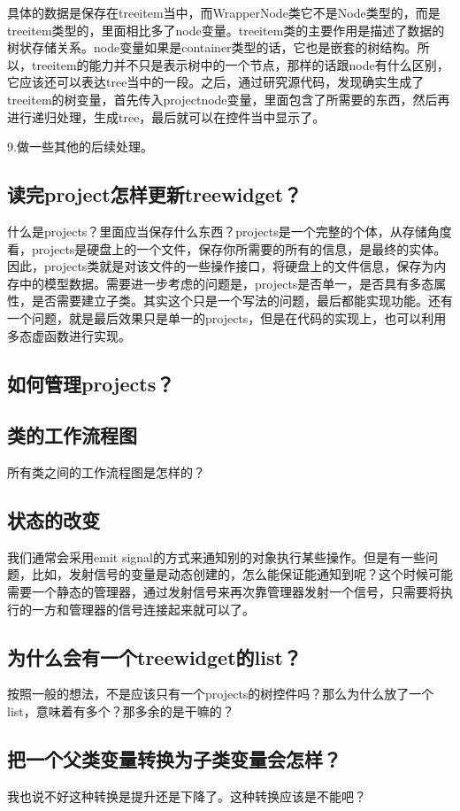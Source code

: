 具体的数据是保存在treeitem当中，而WrapperNode类它不是Node类型的，而是treeitem类型的，里面相比多了node变量。treeitem类的主要作用是描述了数据的树状存储关系。node变量如果是container类型的话，它也是嵌套的树结构。所以，treeitem的能力并不只是表示树中的一个节点，那样的话跟node有什么区别，它应该还可以表达tree当中的一段。之后，通过研究源代码，发现确实生成了treeitem的树变量，首先传入projectnode变量，里面包含了所需要的东西，然后再进行递归处理，生成tree，最后就可以在控件当中显示了。


9.做一些其他的后续处理。
\subsection{读完project怎样更新treewidget？}
什么是projects？里面应当保存什么东西？projects是一个完整的个体，从存储角度看，projects是硬盘上的一个文件，保存你所需要的所有的信息，是最终的实体。因此，projects类就是对该文件的一些操作接口，将硬盘上的文件信息，保存为内存中的模型数据。需要进一步考虑的问题是，projects是否单一，是否具有多态属性，是否需要建立子类。其实这个只是一个写法的问题，最后都能实现功能。还有一个问题，就是最后效果只是单一的projects，但是在代码的实现上，也可以利用多态虚函数进行实现。
\subsection{如何管理projects？}

\subsection{类的工作流程图}
所有类之间的工作流程图是怎样的？

\subsection{状态的改变}
我们通常会采用emit signal的方式来通知别的对象执行某些操作。但是有一些问题，比如，发射信号的变量是动态创建的，怎么能保证能通知到呢？这个时候可能需要一个静态的管理器，通过发射信号来再次靠管理器发射一个信号，只需要将执行的一方和管理器的信号连接起来就可以了。
\subsection{为什么会有一个treewidget的list？}
按照一般的想法，不是应该只有一个projects的树控件吗？那么为什么放了一个list，意味着有多个？那多余的是干嘛的？

\subsection{把一个父类变量转换为子类变量会怎样？}
我也说不好这种转换是提升还是下降了。这种转换应该是不能吧？

